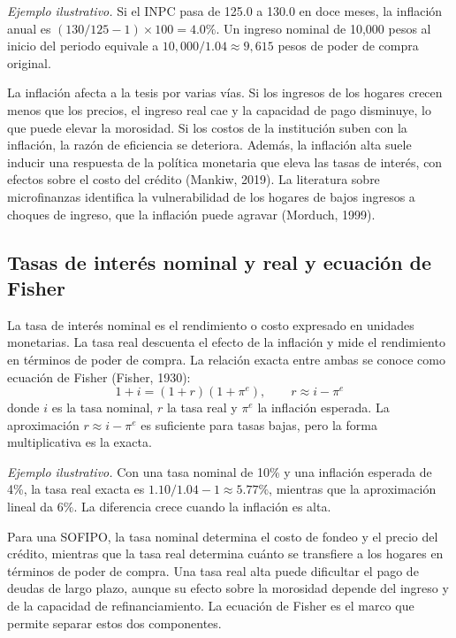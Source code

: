 \textit{Ejemplo ilustrativo.} Si el INPC pasa de 125.0 a 130.0 en doce meses, la inflación anual es $(130/125-1)\times 100=4.0\%$. Un ingreso nominal de 10{,}000 pesos al inicio del periodo equivale a $10{,}000/1.04\approx 9{,}615$ pesos de poder de compra original.

La inflación afecta a la tesis por varias vías. Si los ingresos de los hogares crecen menos que los precios, el ingreso real cae y la capacidad de pago disminuye, lo que puede elevar la morosidad. Si los costos de la institución suben con la inflación, la razón de eficiencia se deteriora. Además, la inflación alta suele inducir una respuesta de la política monetaria que eleva las tasas de interés, con efectos sobre el costo del crédito (Mankiw, 2019). La literatura sobre microfinanzas identifica la vulnerabilidad de los hogares de bajos ingresos a choques de ingreso, que la inflación puede agravar (Morduch, 1999).

\subsection{Tasas de interés nominal y real y ecuación de Fisher}
La tasa de interés nominal es el rendimiento o costo expresado en unidades monetarias. La tasa real descuenta el efecto de la inflación y mide el rendimiento en términos de poder de compra. La relación exacta entre ambas se conoce como ecuación de Fisher (Fisher, 1930):
\begin{equation}
1+i=(1+r)(1+\pi^e), \qquad r\approx i-\pi^e
\label{eq:fisher}
\end{equation}
donde $i$ es la tasa nominal, $r$ la tasa real y $\pi^e$ la inflación esperada. La aproximación $r\approx i-\pi^e$ es suficiente para tasas bajas, pero la forma multiplicativa es la exacta.

\textit{Ejemplo ilustrativo.} Con una tasa nominal de 10\% y una inflación esperada de 4\%, la tasa real exacta es $1.10/1.04-1\approx 5.77\%$, mientras que la aproximación lineal da $6\%$. La diferencia crece cuando la inflación es alta.

Para una SOFIPO, la tasa nominal determina el costo de fondeo y el precio del crédito, mientras que la tasa real determina cuánto se transfiere a los hogares en términos de poder de compra. Una tasa real alta puede dificultar el pago de deudas de largo plazo, aunque su efecto sobre la morosidad depende del ingreso y de la capacidad de refinanciamiento. La ecuación de Fisher es el marco que permite separar estos dos componentes.

